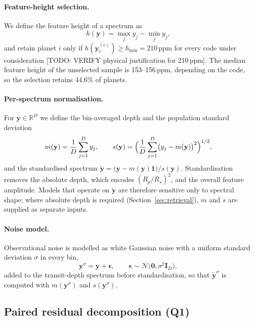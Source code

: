 \paragraph{Feature-height selection.}
We define the feature height of a spectrum as
\begin{equation}
  h(\mathbf{y}) = \max_{j} y_j - \min_{j} y_j ,
  \label{eq:fh}
\end{equation}
and retain planet $i$ only if $h(\mathbf{y}_i^{(c)})\geq h_{\min}=210\,\mathrm{ppm}$ for every code under consideration [TODO: VERIFY physical justification for 210\,ppm].
The median feature height of the unselected sample is 153--156\,ppm, depending on the code, so the selection retains 44.6\% of planets.

\paragraph{Per-spectrum normalisation.}
For $\mathbf{y}\in\mathbb{R}^{D}$ we define the bin-averaged depth and the population standard deviation
\begin{equation}
  m(\mathbf{y}) = \frac{1}{D}\sum_{j=1}^{D} y_j,\qquad
  s(\mathbf{y}) = \Bigl(\frac{1}{D}\sum_{j=1}^{D}\bigl(y_j-m(\mathbf{y})\bigr)^2\Bigr)^{1/2},
  \label{eq:ms}
\end{equation}
and the standardised spectrum $\tilde{\mathbf{y}} = \bigl(\mathbf{y}-m(\mathbf{y})\mathbf{1}\bigr)/s(\mathbf{y})$.
Standardisation removes the absolute depth, which encodes $(R_p/R_\star)^2$, and the overall feature amplitude.
Models that operate on $\tilde{\mathbf{y}}$ are therefore sensitive only to spectral shape; where absolute depth is required (Section~\ref{sec:retrieval}), $m$ and $s$ are supplied as separate inputs.

\paragraph{Noise model.}
Observational noise is modelled as white Gaussian noise with a uniform standard deviation $\sigma$ in every bin,
\begin{equation}
  \mathbf{y}^{\sigma} = \mathbf{y} + \bm{\epsilon},\qquad \bm{\epsilon}\sim\mathcal{N}\bigl(\mathbf{0},\sigma^{2}\mathbf{I}_{D}\bigr),
  \label{eq:noise}
\end{equation}
added to the transit-depth spectrum before standardisation, so that $\tilde{\mathbf{y}}^{\sigma}$ is computed with $m(\mathbf{y}^{\sigma})$ and $s(\mathbf{y}^{\sigma})$.

\subsection{Paired residual decomposition (Q1)}
\label{sec:residuals}

